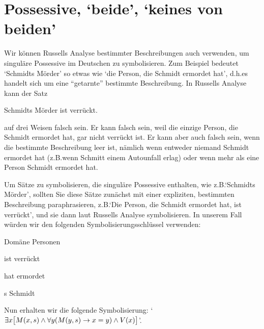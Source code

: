 \section{Possessive, `beide', `keines von beiden'}

Wir können Russells Analyse bestimmter Beschreibungen auch verwenden, um singuläre Possessive im Deutschen zu symbolisieren.  Zum Beispiel bedeutet `Schmidts Mörder' so etwas wie `die Person, die Schmidt ermordet hat', d.h.\@ es handelt sich um eine ``getarnte'' bestimmte Beschreibung. In Russells Analyse kann der Satz 
\begin{earg}
	\item[\ex{smithsmurder}] Schmidts Mörder ist verrückt.
\end{earg}
auf drei Weisen falsch sein. Er kann falsch sein, weil die einzige Person, die Schmidt ermordet hat, gar nicht verrückt ist. Er kann aber auch falsch sein, wenn die bestimmte Beschreibung leer ist, nämlich wenn entweder niemand Schmidt ermordet hat (z.B.\@ wenn Schmitt einem Autounfall erlag) oder wenn mehr als eine Person Schmidt ermordet hat.

Um Sätze zu symbolisieren, die singuläre Possessive enthalten, wie z.B.\@ `Schmidts Mörder', sollten Sie diese Sätze zunächst mit einer expliziten, bestimmten Beschreibung paraphrasieren, z.B.\@ `Die Person, die Schmidt ermordet hat, ist verrückt', und sie dann laut Russells Analyse symbolisieren. In unserem Fall würden wir den folgenden Symbolisierungsschlüssel verwenden:
\begin{ekey}
	\item[Domäne] Personen
	\item[\atom{V}{x}]  ist verrückt %
	\item[\atom{M}{x,y}]  hat  ermordet
	\item[s] Schmidt
\end{ekey}
Nun erhalten wir die folgende Symbolisierung: `$\exists x\bigl[\mathord{M}(x,s) \wedge \forall y(\mathord{M}(y,s) \rightarrow x=y) \wedge \mathord{V}(x)\bigr]$'.

